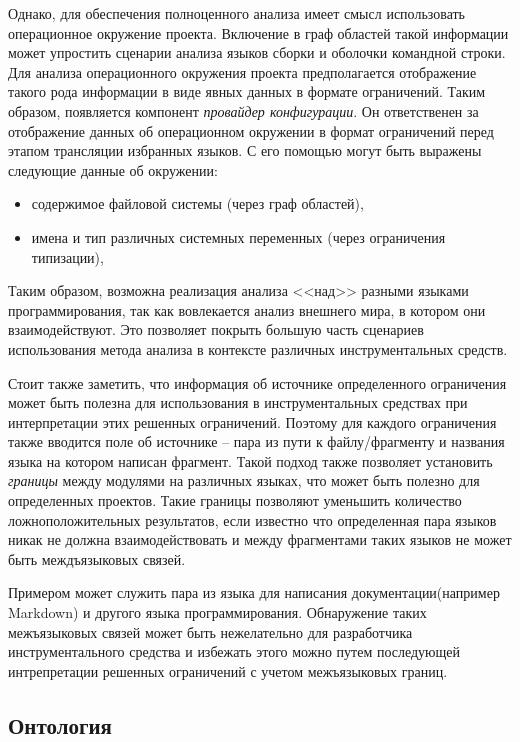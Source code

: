 Однако, для обеспечения полноценного анализа имеет смысл использовать операционное окружение
проекта. Включение в граф областей такой информации может упростить сценарии анализа
языков сборки и оболочки командной строки.
Для анализа операционного окружения проекта предполагается отображение такого рода информации в виде
явных данных в формате ограничений. Таким образом, появляется компонент \textit{провайдер конфигурации}.
Он ответственен за отображение данных об операционном окружении в формат ограничений перед
этапом трансляции избранных языков. С его помощью могут быть выражены следующие данные об окружении:
\begin{itemize}
    \item содержимое файловой системы (через граф областей),
    \item имена и тип различных системных переменных (через ограничения типизации),
\end{itemize}

Таким образом, возможна реализация анализа <<над>> разными языками программирования, так как
 вовлекается анализ внешнего мира, в котором они взаимодействуют. Это позволяет
 покрыть большую часть сценариев использования метода анализа в контексте различных
 инструментальных средств. 

Стоит также заметить, что информация об источнике определенного ограничения может быть полезна для использования
в инструментальных средствах при интерпретации этих решенных ограничений. Поэтому для каждого ограничения также вводится
поле об источнике -- пара из пути к файлу/фрагменту и названия языка на котором написан фрагмент. Такой
подход также позволяет установить \textit{границы} между модулями на различных языках, что может быть полезно
для определенных проектов. Такие границы позволяют уменьшить количество ложноположительных результатов, если
известно что определенная пара языков никак не должна взаимодействовать и между фрагментами таких языков не может быть
междъязыковых связей. 

Примером может служить пара из языка для написания документации(например Markdown) и другого языка программирования.
Обнаружение таких межъязыковых связей может быть нежелательно для разработчика инструментального средства и
избежать этого можно путем последующей интрепретации решенных ограничений с учетом межъязыковых границ.

\subsection{Онтология}

